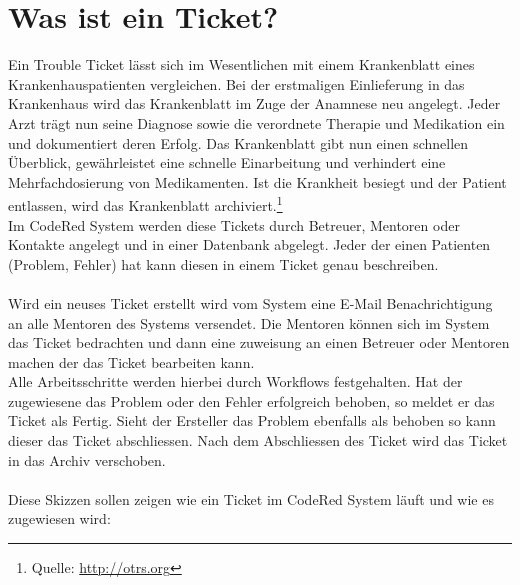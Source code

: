 \chapter{Was ist ein Ticket?}  %
\label{chapter:Was ist ein Ticket?}  %

Ein Trouble Ticket lässt sich im Wesentlichen mit einem Krankenblatt eines Krankenhauspatienten vergleichen. Bei der erstmaligen Einlieferung in das Krankenhaus wird das Krankenblatt im Zuge der Anamnese neu angelegt. Jeder Arzt trägt nun seine Diagnose sowie die verordnete Therapie und Medikation ein und dokumentiert deren Erfolg. Das Krankenblatt gibt nun einen schnellen Überblick, gewährleistet eine schnelle Einarbeitung und verhindert eine Mehrfachdosierung von Medikamenten. Ist die Krankheit besiegt und der Patient entlassen, wird das Krankenblatt archiviert.\footnotemark[1]
\footnote[1]{Quelle: \href{http://otrs.org/}{http://otrs.org} }
\\
Im CodeRed System werden diese Tickets durch Betreuer, Mentoren oder Kontakte angelegt und in einer Datenbank abgelegt. Jeder der einen Patienten (Problem, Fehler) hat kann diesen in einem Ticket genau beschreiben.\\
\\
Wird ein neuses Ticket erstellt wird vom System eine E-Mail Benachrichtigung an alle Mentoren des Systems versendet. Die Mentoren können sich im System das Ticket bedrachten und dann eine zuweisung an einen Betreuer oder Mentoren machen der das Ticket bearbeiten kann. \\
Alle Arbeitsschritte werden hierbei durch Workflows festgehalten. Hat der zugewiesene das Problem oder den Fehler erfolgreich behoben, so meldet er das Ticket als \qquad Fertig\qquad. Sieht der Ersteller das Problem ebenfalls als behoben so kann dieser das Ticket abschliessen. Nach dem Abschliessen des Ticket wird das Ticket in das Archiv verschoben.
\\
\\
Diese Skizzen sollen zeigen wie ein Ticket im CodeRed System läuft und wie es zugewiesen wird:\\

